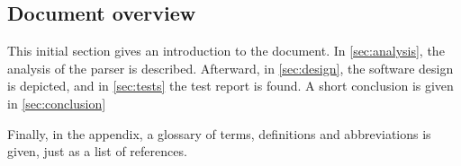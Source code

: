 
\subsection{Document overview}
This initial section gives an introduction to the document.
In \autoref{sec:analysis}, the analysis of the parser is described.
Afterward, in \autoref{sec:design}, the software design is depicted, and in \autoref{sec:tests} the test report is found.
A short conclusion is given in \autoref{sec:conclusion}

Finally, in the appendix, a glossary of terms, definitions and abbreviations is given, just as a list of references.
